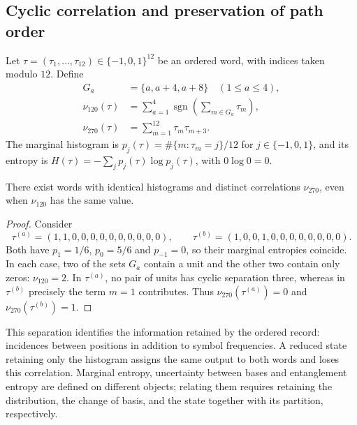 \subsection{Cyclic correlation and preservation of path order}
\label{sec:rec27-memoria}

Let $\tau=(\tau_1,\ldots,\tau_{12})\in\{-1,0,1\}^{12}$ be an ordered
word, with indices taken modulo $12$. Define
\[
\begin{aligned}
 G_a&=\{a,a+4,a+8\}\quad(1\leq a\leq4),\\
 \nu_{120}(\tau)&=\sum_{a=1}^4\operatorname{sgn}
 \left(\sum_{m\in G_a}\tau_m\right),\\
 \nu_{270}(\tau)&=\sum_{m=1}^{12}\tau_m\tau_{m+3}.
\end{aligned}
\]
The marginal histogram is $p_j(\tau)=\#\{m:\tau_m=j\}/12$ for
$j\in\{-1,0,1\}$, and its entropy is
$H(\tau)=-\sum_j p_j(\tau)\log p_j(\tau)$, with $0\log0=0$.

\begin{proposition}
There exist words with identical histograms and distinct correlations
$\nu_{270}$, even when $\nu_{120}$ has the same value.
\end{proposition}
\begin{proof}
Consider
\[
 \tau^{(a)}=(1,1,0,0,0,0,0,0,0,0,0,0),\qquad
 \tau^{(b)}=(1,0,0,1,0,0,0,0,0,0,0,0).
\]
Both have $p_1=1/6$, $p_0=5/6$ and $p_{-1}=0$, so their marginal
entropies coincide. In each case, two of the sets $G_a$ contain a unit and
the other two contain only zeros: $\nu_{120}=2$.
In $\tau^{(a)}$, no pair of units has cyclic separation three, whereas in
$\tau^{(b)}$ precisely the term $m=1$ contributes.
Thus $\nu_{270}(\tau^{(a)})=0$ and $\nu_{270}(\tau^{(b)})=1$.
\end{proof}

This separation identifies the information retained by the ordered record:
incidences between positions in addition to symbol frequencies.
A reduced state retaining only the histogram assigns the same output to
both words and loses this correlation. Marginal entropy, uncertainty
between bases and entanglement entropy are defined on different objects;
relating them requires retaining the distribution, the change of basis,
and the state together with its partition, respectively.
